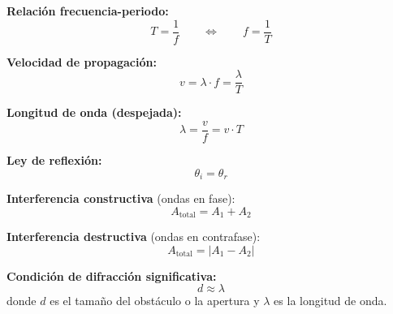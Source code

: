 \begin{nota}

\textbf{Relación frecuencia-periodo:}
$$T = \frac{1}{f} \qquad \Longleftrightarrow \qquad f = \frac{1}{T}$$

\vspace{0.3cm}

\textbf{Velocidad de propagación:}
$$v = \lambda \cdot f = \frac{\lambda}{T}$$

\vspace{0.3cm}

\textbf{Longitud de onda (despejada):}
$$\lambda = \frac{v}{f} = v \cdot T$$

\vspace{0.3cm}

\textbf{Ley de reflexión:}
$$\theta_i = \theta_r$$

\vspace{0.3cm}

\textbf{Interferencia constructiva} (ondas en fase):
$$A_{\text{total}} = A_1 + A_2$$

\vspace{0.3cm}

\textbf{Interferencia destructiva} (ondas en contrafase):
$$A_{\text{total}} = |A_1 - A_2|$$

\vspace{0.3cm}

\textbf{Condición de difracción significativa:}
$$d \approx \lambda$$
donde $d$ es el tamaño del obstáculo o la apertura y $\lambda$ es la longitud de onda.

\end{nota}